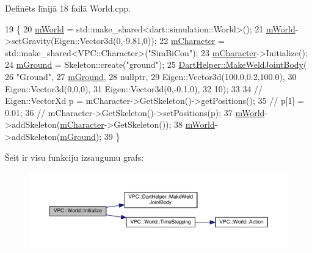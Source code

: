 Definēts līnijā 18 failā World.\+cpp.


\begin{DoxyCode}
19 \{
20     \hyperlink{class_v_p_c_1_1_world_a4a70a334fda433d89f96c0858368020e}{mWorld} = std::make\_shared<dart::simulation::World>();
21     \hyperlink{class_v_p_c_1_1_world_a4a70a334fda433d89f96c0858368020e}{mWorld}->setGravity(Eigen::Vector3d(0,-9.81,0));
22     \hyperlink{class_v_p_c_1_1_world_a7cb13d4f5210b3dc9156025920d25ad6}{mCharacter} = std::make\_shared<VPC::Character>(\textcolor{stringliteral}{"SimBiCon"});
23     \hyperlink{class_v_p_c_1_1_world_a7cb13d4f5210b3dc9156025920d25ad6}{mCharacter}->Initialize();
24     \hyperlink{class_v_p_c_1_1_world_ab2bdb8cd4e8fa1e043cceef8a2c123f1}{mGround} = Skeleton::create(\textcolor{stringliteral}{"ground"});
25     \hyperlink{namespace_v_p_c_1_1_dart_helper_a70dd049386ce8ba7d9fdb96407d8c3d3}{DartHelper::MakeWeldJointBody}(
26         \textcolor{stringliteral}{"Ground"},
27         \hyperlink{class_v_p_c_1_1_world_ab2bdb8cd4e8fa1e043cceef8a2c123f1}{mGround},
28         \textcolor{keyword}{nullptr},
29         Eigen::Vector3d(100.0,0.2,100.0),
30         Eigen::Vector3d(0,0,0),
31         Eigen::Vector3d(0,-0.1,0),
32         10);
33     
34     \textcolor{comment}{// Eigen::VectorXd p = mCharacter->GetSkeleton()->getPositions();}
35     \textcolor{comment}{// p[1] = 0.01;}
36     \textcolor{comment}{// mCharacter->GetSkeleton()->setPositions(p);}
37     \hyperlink{class_v_p_c_1_1_world_a4a70a334fda433d89f96c0858368020e}{mWorld}->addSkeleton(\hyperlink{class_v_p_c_1_1_world_a7cb13d4f5210b3dc9156025920d25ad6}{mCharacter}->GetSkeleton());
38     \hyperlink{class_v_p_c_1_1_world_a4a70a334fda433d89f96c0858368020e}{mWorld}->addSkeleton(\hyperlink{class_v_p_c_1_1_world_ab2bdb8cd4e8fa1e043cceef8a2c123f1}{mGround});
39 \}
\end{DoxyCode}


Šeit ir visu funkciju izsaugumu grafs\+:
\nopagebreak
\begin{figure}[H]
\begin{center}
\leavevmode
\includegraphics[width=350pt]{class_v_p_c_1_1_world_ab539deccddaf2d046421fb1597c9f75f_cgraph}
\end{center}
\end{figure}




